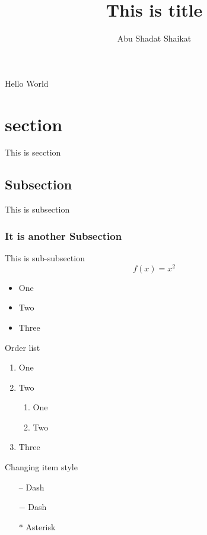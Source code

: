\documentclass{article}
\begin{document}
\title{This is title}
\author{Abu Shadat Shaikat}
	Hello World
	\section{section}
	This is secction
	\subsection{Subsection}
	This is subsection
	\subsubsection{It is another Subsection}
	This is sub-subsection
	\begin{equation}
		f(x)=x^2
	\end{equation}
	\begin{itemize}
		\item One 
		\item Two
		\item Three
	\end{itemize}
Order list
\begin{enumerate}
	\item One
	\item Two
	\begin{enumerate}
		\item One 
		\item Two
	\end{enumerate}
	\item Three
\end{enumerate}
Changing item style
\begin{itemize}
	\item[--] Dash
	\item[$-$] Dash
	\item[$\ast$] Asterisk
\end{itemize}
\end{document}
